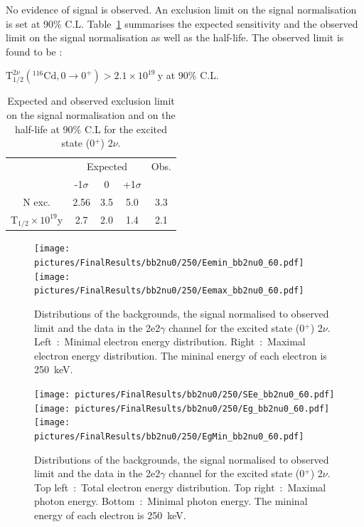 \documentclass[main.tex]{subfiles}
\begin{document}
\bigskip


\NI No evidence of signal is observed. An exclusion limit on the signal normalisation is set at 90\% C.L. Table~\ref{Tab:FinalResultsbb2nu0} summarises the expected sensitivity and the observed limit on the signal normalisation as well as the half-life. The observed limit is found to be : 


\begin{center}
$ \text{T}_{\text{1/2}}^{\text{2}\nu} (^{\text{116}} \text{Cd}, \text{0} \rightarrow \text{0}^{+}) > \text{2.1} \times \text{10}^{\text{19}}~\text{y}$ at 90\% C.L.
\end{center}


\begin{table}
\centering
\begin{tabular}{c|c|c|c||c}
 & \multicolumn{3}{c||}{Expected} & Obs. \\
                                                & -1$\sigma$ & 0        & +1$\sigma$ &          \\[0.2cm]
\hline
N exc.                                          & 2.56       & 3.5      & 5.0          & 3.3     \\[0.2cm]
T$_{\text{1/2}} \times \text{10}^{\text{19}}$y  & 2.7        & 2.0      & 1.4          & 2.1      \\[0.2cm]
\hline 
\end{tabular}
\caption{Expected and observed exclusion limit on the signal normalisation and on the half-life at 90\% C.L for the excited state (0$^+$) 2$\nu$.}
\label{Tab:FinalResultsbb2nu0}
\end{table}

\begin{figure} [h!]
\begin{center}
\texttt{[image: pictures/FinalResults/bb2nu0/250/Eemin\_bb2nu0\_60.pdf]}
\texttt{[image: pictures/FinalResults/bb2nu0/250/Eemax\_bb2nu0\_60.pdf]}
\end{center}
\caption{Distributions of the backgrounds, the signal normalised to observed limit and the data in the 2e2$\gamma$ channel for the excited state (0$^+$) 2$\nu$. Left~:~Minimal electron energy distribution. Right~:~Maximal electron energy distribution. The mininal energy of each electron is 250~keV.}
\label{plot:EeminAndEemax250bb2nu0_250}
\end{figure}


\begin{figure} [h!]
\begin{center}
\texttt{[image: pictures/FinalResults/bb2nu0/250/SEe\_bb2nu0\_60.pdf]}
\texttt{[image: pictures/FinalResults/bb2nu0/250/Eg\_bb2nu0\_60.pdf]}
\texttt{[image: pictures/FinalResults/bb2nu0/250/EgMin\_bb2nu0\_60.pdf]}
\end{center}
\caption{Distributions of the backgrounds, the signal normalised to observed limit and the data in the 2e2$\gamma$ channel for the excited state (0$^+$) 2$\nu$. Top left~:~Total electron energy distribution. Top right~:~Maximal photon energy. Bottom~:~Minimal photon energy. The mininal energy of each electron is 250~keV.}
\label{plot:SEeAndEg250bb2nu0_250}
\end{figure}
\end{document}
